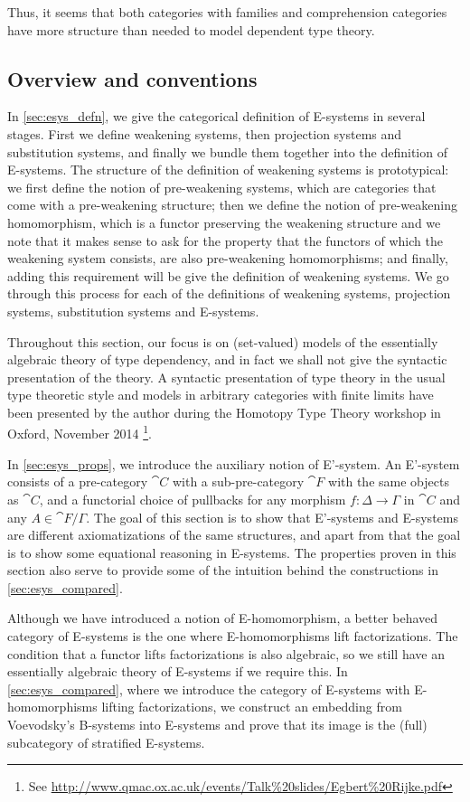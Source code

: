 Thus, it seems that both categories with families and comprehension categories
have more structure than needed to model dependent type theory.

\subsection*{Overview and conventions}
In \autoref{sec:esys_defn}, we give the categorical definition of E-systems in 
several stages. First we define weakening systems, then projection systems and
substitution systems, and finally we bundle them together into the definition
of E-systems. The structure of the definition of weakening systems is 
prototypical: we first define the notion of pre-weakening systems, which are
categories that come with a pre-weakening structure; then we define the notion
of pre-weakening homomorphism, which is a functor preserving the weakening
structure and we note that it makes sense to ask for the property that the
functors of which the weakening system consists, are also pre-weakening
homomorphisms; and finally, adding this requirement will be give the definition
of weakening systems. We go through this process for each of the definitions
of weakening systems, projection systems, substitution systems and E-systems.

Throughout this section, our focus is on (set-valued) models of the essentially algebraic
theory of type dependency, and in fact we shall not give the syntactic
presentation of the theory. A syntactic presentation of type theory in the
usual type theoretic style and models in arbitrary categories with finite limits
have been presented by the author during the Homotopy Type Theory workshop in
Oxford, November 2014%
\footnote{See \url{http://www.qmac.ox.ac.uk/events/Talk\%20slides/Egbert\%20Rijke.pdf}}.

In \autoref{sec:esys_props}, we introduce the auxiliary notion of E'-system.
An E'-system consists of a pre-category $\cat{C}$ with a sub-pre-category
$\cat{F}$ with the same objects as $\cat{C}$, and a functorial choice of
pullbacks for any morphism $f:\Delta\to\Gamma$ in $\cat{C}$ and any
$A\in\cat{F}/\Gamma$. The goal of this section is to show that 
E'-systems and E-systems are different axiomatizations of the same structures,
and apart from that the goal is to show some equational reasoning in E-systems.
The properties proven in this section also serve to provide some of the 
intuition behind the constructions in \autoref{sec:esys_compared}.

Although we have introduced a notion of E-homomorphism, a better behaved category
of E-systems is the one where E-homomorphisms lift factorizations. The condition
that a functor lifts factorizations is also algebraic, so we still have an
essentially algebraic theory of E-systems if we require this.
In \autoref{sec:esys_compared}, where we introduce the category of E-systems
with E-homomorphisms lifting factorizations, we construct an embedding from Voevodsky's
B-systems into E-systems and prove that its image is the (full) subcategory
of stratified E-systems. 

